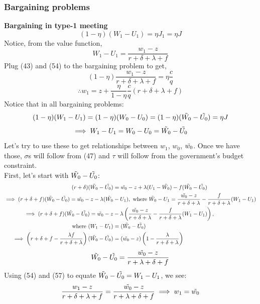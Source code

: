 \documentclass[12pt]{article} %
\theoremstyle{definition}
\begin{document}
\subsubsection{Bargaining problems}
\textbf{Bargaining in type-1 meeting}
$$(1-\eta)(W_1-U_1) = \eta J_1 = \eta J$$
Notice, from the value function,
\begin{equation}
W_1-U_1=\frac{w_1-z}{r+\delta+\lambda+f}
\end{equation}
Plug (43) and (54) to the bargaining problem to get, 
$$(1-\eta)\frac{w_1-z}{r+\delta+\lambda+f} = \eta \frac{c}{q}$$
\begin{equation}
    \therefore w_1 = z + \frac{\eta}{1-\eta}\frac{c}{q}(r+\delta+\lambda+f)
\end{equation}
Notice that in all bargaining problems: 
$$(1-\eta)(W_1-U_1) = (1-\eta)(W_0-U_0)=(1-\eta)(\Tilde{W_0}-\Tilde{U_0})=\eta J$$
\begin{equation}
    \implies W_1-U_1 = W_0-U_0 = \Tilde{W_0}-\Tilde{U_0}
\end{equation}
Let's try to use these to get relationships between $w_1$, $w_0$, $\Tilde{w_0}$. Once we have those, $\sigma$s will follow from (47) and $\tau$ will follow from the government's budget constraint. \\
First, let's start with $\Tilde{W_0}-\Tilde{U_0}$: 
\begin{align*}
  (r+\delta)(\Tilde{W_0}-\Tilde{U_0})&=\Tilde{w_0}-z+\lambda(U_1-\Tilde{W_0})-f(\Tilde{W_0}-\Tilde{U_0}) \\
  \implies (r+\delta+f)(\Tilde{W_0}-\Tilde{U_0})=\Tilde{w_0}-z-\lambda(\Tilde{W_0}&-U_1), \textrm{ where } \Tilde{W_0}-U_1=\frac{\Tilde{w_0}-z}{r+\delta+\lambda}-\frac{f}{r+\delta+\lambda}(W_1-U_1)\\
   \implies (r+\delta+f)(\Tilde{W_0}-\Tilde{U_0})=\Tilde{w_0}-z&-\lambda \left(\frac{\Tilde{w_0}-z}{r+\delta+\lambda}-\frac{f}{r+\delta+\lambda}(W_1-U_1)\right),\\ \text{where } (W_1-U_1) &= (\Tilde{W_0}-\Tilde{U_0}) \\
   \implies \left(r+\delta+f-\frac{\lambda f}{r+\delta+\lambda} \right)(\Tilde{W_0}-\Tilde{U_0}) &= (\Tilde{w_0}-z)\left(1-\frac{\lambda}{r+\delta+\lambda}\right)
\end{align*}
\begin{equation}
    \Tilde{W_0}-\Tilde{U_0} = \frac{\Tilde{w_0}-z}{r+\lambda+\delta+f}
\end{equation}
Using (54) and (57) to equate $ \Tilde{W_0}-\Tilde{U_0}=W_1-U_1$, we see:
\begin{equation}
 \frac{w_1-z}{r+\delta+\lambda+f} = \frac{\Tilde{w_0}-z}{r+\lambda+\delta+f} \implies w_1=\Tilde{w_0}
\end{equation}
\end{document}
